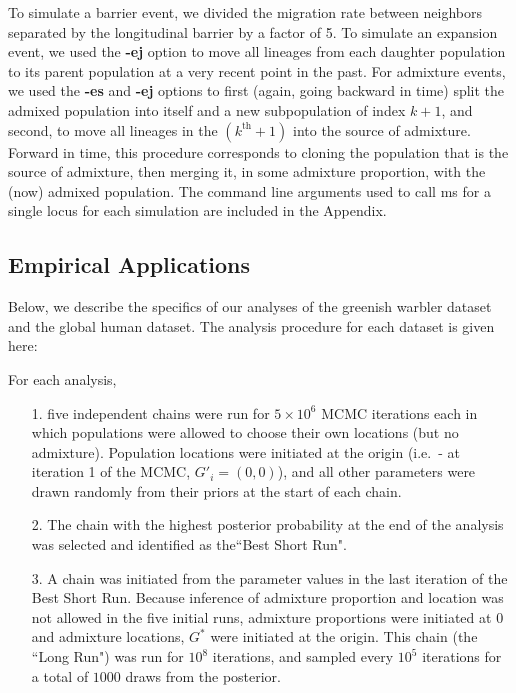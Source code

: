 \documentclass[12pt]{article}
\newcommand{\admixsource}[1]{{$G^{*}$}}
\begin{document}
To simulate a barrier event, we divided the migration rate between neighbors separated by the longitudinal barrier by a factor of 5.  To simulate an expansion event, we used the \textbf{-ej} option to move all lineages from each daughter population to its parent population at a very recent point in the past.  For admixture events, we used the \textbf{-es} and \textbf{-ej} options to first (again, going backward in time) split the admixed population into itself and a new subpopulation of index $k + 1$, and second, to move all lineages in the $(k^{\text{th}} + 1)$ into the source of admixture.  Forward in time, this procedure corresponds to cloning the population that is the source of admixture, then merging it, in some admixture proportion, with the (now) admixed population.  The command line arguments used to call ms for a single locus for each simulation are included in the Appendix.

\subsection*{Empirical Applications}
Below, we describe the specifics of our analyses of the greenish warbler dataset and the global human dataset.  The analysis procedure for each dataset is given here:

For each analysis,
\begin{itemize}
\item[1.] five independent chains were run for $5\times 10^6$ MCMC iterations each in which populations were allowed to choose their own locations (but no admixture).  Population locations were initiated at the origin (i.e.\ - at iteration 1 of the MCMC, $G'_i = (0,0)$), and all other parameters were drawn randomly from their priors at the start of each chain.  
%
\item[2.]The chain with the highest posterior probability at the end of the analysis was selected and identified as the``Best Short Run".
%
\item[3.] A chain was initiated from the parameter values in the last iteration of the Best Short Run.  Because inference of admixture proportion and location was not allowed in the five initial runs, admixture proportions were initiated at 0 and admixture locations, \admixsource{G} were initiated at the origin.  This  chain (the ``Long Run") was run for $10^8$ iterations, and sampled every $10^5$ iterations for a total of $1000$ draws from the posterior.
\end{itemize}
\end{document}
